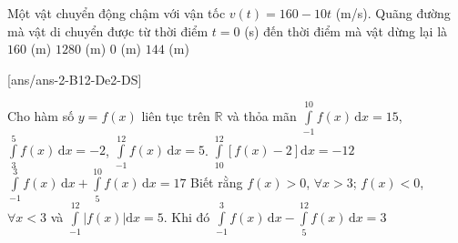 \begin{ex}%
	Một vật chuyển động chậm với vận tốc $v(t)=160-10t$ (m/s). Quãng đường mà vật di chuyển được từ thời điểm $t=0$ (s) đến thời điểm mà vật dừng lại là
	\choice
	{$160$ (m)}
	{\True $1280$ (m)}
	{$0$ (m)}
	{$144$ (m)}
\end{ex}
[ans/ans-2-B12-De2-DS]
\TNTF
\begin{ex}%
	Cho hàm số $y=f(x)$ liên tục trên $\mathbb{R}$ và thỏa mãn $\displaystyle \int\limits_{-1}^{10} f(x)\mathrm{\,d}x=15$,\break $\displaystyle \int\limits_{3}^{5} f(x) \mathrm{\,d}x=-2$, $\displaystyle \int\limits_{-1}^{12} f(x) \mathrm{\,d}x=5$.
	{$\displaystyle \int\limits_{10}^{12} \left[f(x)-2\right] \mathrm{d}x=-12$}
	{\True $\displaystyle \int\limits_{-1}^{3} f(x) \mathrm{\,d}x + \int\limits_{5}^{10} f(x) \mathrm{\,d}x=17$}
	{Biết rằng $f(x)>0$, $\forall x>3$; $f(x)<0$, $\forall x<3$ và $\displaystyle \int\limits_{-1}^{12} \left|f(x)\right|\mathrm{d}x=5$. Khi đó $\displaystyle \int\limits_{-1}^{3} f(x)\mathrm{\,d}x - \int\limits_{5}^{12} f(x)\mathrm{\,d}x=3$}
	\loigiai{
		
}
\end{ex}
